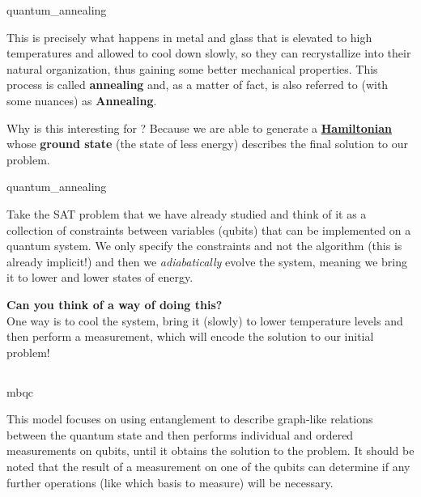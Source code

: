 \documentclass[aspectratio=43]{beamer}
\begin{document}
\begin{frameImg}[height]{quantum_annealing}
    \begin{card}
        This is precisely what happens in metal and glass that is elevated to high temperatures and allowed to cool down slowly, so they can recrystallize into their natural organization, thus gaining some better mechanical properties. This process is called \textbf{annealing} and, as a matter of fact, \aqc is also referred to (with some nuances) as \textbf{\q Annealing}.
    \end{card}
    \begin{card}
        Why is this interesting for \qc? Because we are able to generate a \href{https://en.wikipedia.org/wiki/Hamiltonian_(quantum_mechanics)}{\textbf{Hamiltonian}} whose \textbf{ground state} (the state of less energy) describes the final solution to our problem.
    \end{card}
\pagenumber
\end{frameImg}

\begin{frameImg}[height]{quantum_annealing}
    \begin{card}
        Take the SAT problem that we have already studied and think of it as a collection of constraints between variables (qubits) that can be implemented on a quantum system. We only specify the constraints and not the algorithm (this is already implicit!) and then we \textit{adiabatically} evolve the system, meaning we bring it to lower and lower states of energy.
    \end{card}
    \begin{card}
        \textbf{Can you think of a way of doing this?}\\
        One way is to cool the system, bring it (slowly) to lower temperature levels and then perform a measurement, which will encode the solution to our initial problem!
    \end{card}
\pagenumber
\end{frameImg}



\subsection{\mbqc}
\begin{frameImg}[height]{mbqc}
    \begin{card}
        This model focuses on using entanglement to describe graph-like relations between the quantum state and then performs individual and ordered measurements on qubits, until it obtains the solution to the problem. It should be noted that the result of a measurement on one of the qubits can determine if any further operations (like which basis to measure) will be necessary.
    \end{card}
\pagenumber
\end{frameImg}
\end{document}

